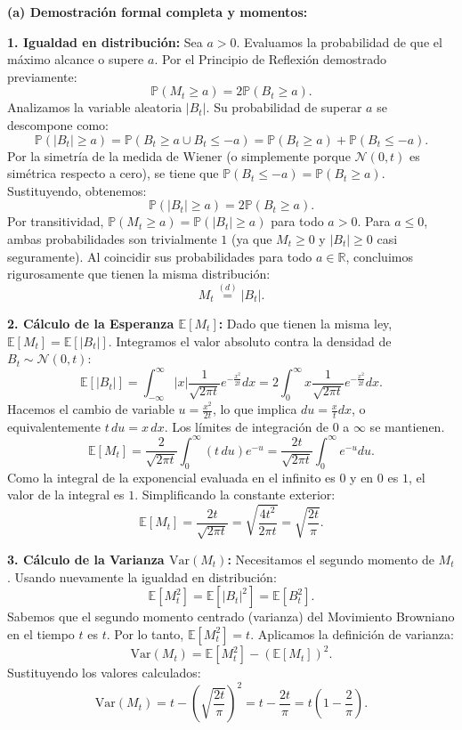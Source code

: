 \documentclass[11pt, letterpaper]{article}
\begin{document}
\begin{solucion}
    \vspace{3mm}
    \textbf{(a) Demostración formal completa y momentos:}

    \textbf{1. Igualdad en distribución:}
    Sea $a > 0$. Evaluamos la probabilidad de que el máximo alcance o supere $a$. Por el Principio de Reflexión demostrado previamente:
    \[ \mathbb{P}(M_t \ge a) = 2\mathbb{P}(B_t \ge a). \]
    Analizamos la variable aleatoria $|B_t|$. Su probabilidad de superar $a$ se descompone como:
    \[ \mathbb{P}(|B_t| \ge a) = \mathbb{P}(B_t \ge a \cup B_t \le -a) = \mathbb{P}(B_t \ge a) + \mathbb{P}(B_t \le -a). \]
    Por la simetría de la medida de Wiener (o simplemente porque $\mathcal{N}(0, t)$ es simétrica respecto a cero), se tiene que $\mathbb{P}(B_t \le -a) = \mathbb{P}(B_t \ge a)$.
    Sustituyendo, obtenemos:
    \[ \mathbb{P}(|B_t| \ge a) = 2\mathbb{P}(B_t \ge a). \]
    Por transitividad, $\mathbb{P}(M_t \ge a) = \mathbb{P}(|B_t| \ge a)$ para todo $a > 0$. Para $a \le 0$, ambas probabilidades son trivialmente $1$ (ya que $M_t \ge 0$ y $|B_t| \ge 0$ casi seguramente). Al coincidir sus probabilidades para todo $a \in \mathbb{R}$, concluimos rigurosamente que tienen la misma distribución:
    \[ M_t \stackrel{(d)}{=} |B_t|. \]

    \textbf{2. Cálculo de la Esperanza $\mathbb{E}[M_t]$:}
    Dado que tienen la misma ley, $\mathbb{E}[M_t] = \mathbb{E}[|B_t|]$. Integramos el valor absoluto contra la densidad de $B_t \sim \mathcal{N}(0, t)$:
    \[ \mathbb{E}[|B_t|] = \int_{-\infty}^{\infty} |x| \frac{1}{\sqrt{2\pi t}} e^{-\frac{x^2}{2t}} dx = 2 \int_0^{\infty} x \frac{1}{\sqrt{2\pi t}} e^{-\frac{x^2}{2t}} dx. \]
    Hacemos el cambio de variable $u = \frac{x^2}{2t}$, lo que implica $du = \frac{x}{t} dx$, o equivalentemente $t \, du = x \, dx$. Los límites de integración de $0$ a $\infty$ se mantienen.
    \[ \mathbb{E}[M_t] = \frac{2}{\sqrt{2\pi t}} \int_0^{\infty} (t \, du) e^{-u} = \frac{2t}{\sqrt{2\pi t}} \int_0^{\infty} e^{-u} du. \]
    Como la integral de la exponencial evaluada en el infinito es $0$ y en $0$ es $1$, el valor de la integral es $1$. Simplificando la constante exterior:
    \[ \mathbb{E}[M_t] = \frac{2t}{\sqrt{2\pi t}} = \sqrt{\frac{4t^2}{2\pi t}} = \sqrt{\frac{2t}{\pi}}. \]

    \textbf{3. Cálculo de la Varianza $\text{Var}(M_t)$:}
    Necesitamos el segundo momento de $M_t$. Usando nuevamente la igualdad en distribución:
    \[ \mathbb{E}[M_t^2] = \mathbb{E}[|B_t|^2] = \mathbb{E}[B_t^2]. \]
    Sabemos que el segundo momento centrado (varianza) del Movimiento Browniano en el tiempo $t$ es $t$. Por lo tanto, $\mathbb{E}[M_t^2] = t$.
    Aplicamos la definición de varianza:
    \[ \text{Var}(M_t) = \mathbb{E}[M_t^2] - (\mathbb{E}[M_t])^2. \]
    Sustituyendo los valores calculados:
    \[ \text{Var}(M_t) = t - \left( \sqrt{\frac{2t}{\pi}} \right)^2 = t - \frac{2t}{\pi} = t \left( 1 - \frac{2}{\pi} \right). \]


\end{solucion}
\end{document}
